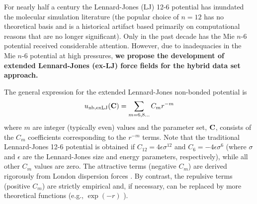 \documentclass[12pt,a4paper]{article}
\newcommand{\bfm}[1]{{\bf #1}}
\newcommand{\C}{\bfm{C}}
\begin{document}






For nearly half a century the Lennard-Jones (LJ) 12-6 potential has inundated the molecular simulation literature (the popular choice of $n=12$ has no theoretical basis and is a historical artifact based primarily on computational reasons that are no longer significant). Only in the past decade has the Mie $n$-6 potential received considerable attention. However, due to inadequacies in the Mie $n$-6 potential at high pressures, \textbf{we propose the development of extended Lennard-Jones (ex-LJ) force fields for the hybrid data set approach.} 

The general expression for the extended Lennard-Jones non-bonded potential is
\begin{equation} \label{ex-LJ general}
u_{\rm nb, exLJ}(\C) = \sum_{m = 6, 8 ...} C_m r^{-m} 
\end{equation} 
where $m$ are integer (typically even) values and the parameter set, $\C$, consists of the $C_m$ coefficients corresponding to the $r^{-m}$ terms. Note that the traditional Lennard-Jones 12-6 potential is obtained if $C_{12} = 4\epsilon\sigma^{12}$ and $C_6=-4\epsilon\sigma^{6}$ (where $\sigma$ and $\epsilon$ are the Lennard-Jones size and energy parameters, respectively), while all other $C_m$ values are zero. The attractive terms (negative $C_m$) are derived rigorously from London dispersion forces \cite{Stone2013}. By contrast, the repulsive terms (positive $C_m$) are strictly empirical and, if necessary, can be replaced by more theoretical functions (e.g., $\exp(-r)$ \cite{Hellmann2017,Przybytek2017}). 
\end{document}
